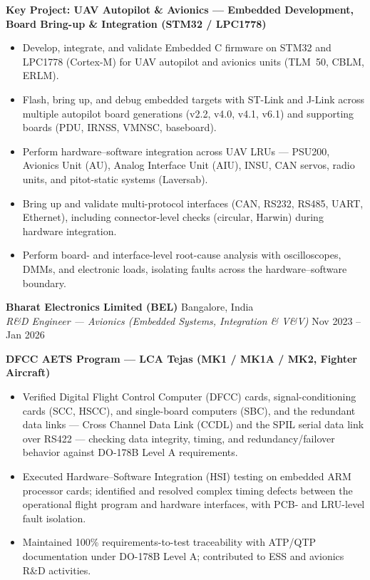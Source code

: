\documentclass[11pt,a4paper]{article}
\begin{document}
\textbf{Key Project: UAV Autopilot \& Avionics --- Embedded Development, Board Bring-up \& Integration (STM32 / LPC1778)}
\begin{itemize}
    \item Develop, integrate, and validate Embedded C firmware on STM32 and LPC1778 (Cortex-M) for UAV autopilot and avionics units (TLM~50, CBLM, ERLM).
    \item Flash, bring up, and debug embedded targets with ST-Link and J-Link across multiple autopilot board generations (v2.2, v4.0, v4.1, v6.1) and supporting boards (PDU, IRNSS, VMNSC, baseboard).
    \item Perform hardware--software integration across UAV LRUs --- PSU200, Avionics Unit (AU), Analog Interface Unit (AIU), INSU, CAN servos, radio units, and pitot-static systems (Laversab).
    \item Bring up and validate multi-protocol interfaces (CAN, RS232, RS485, UART, Ethernet), including connector-level checks (circular, Harwin) during hardware integration.
    \item Perform board- and interface-level root-cause analysis with oscilloscopes, DMMs, and electronic loads, isolating faults across the hardware--software boundary.
\end{itemize}

\vspace{4pt}
\textbf{Bharat Electronics Limited (BEL)} \hfill Bangalore, India\\
\textit{R\&D Engineer --- Avionics (Embedded Systems, Integration \& V\&V)} \hfill Nov 2023 -- Jan 2026

\textbf{DFCC AETS Program --- LCA Tejas (MK1 / MK1A / MK2, Fighter Aircraft)}
\begin{itemize}
    \item Verified Digital Flight Control Computer (DFCC) cards, signal-conditioning cards (SCC, HSCC), and single-board computers (SBC), and the redundant data links --- Cross Channel Data Link (CCDL) and the SPIL serial data link over RS422 --- checking data integrity, timing, and redundancy/failover behavior against DO-178B Level A requirements.
    \item Executed Hardware--Software Integration (HSI) testing on embedded ARM processor cards; identified and resolved complex timing defects between the operational flight program and hardware interfaces, with PCB- and LRU-level fault isolation.
    \item Maintained 100\% requirements-to-test traceability with ATP/QTP documentation under DO-178B Level A; contributed to ESS and avionics R\&D activities.
\end{itemize}
\end{document}
